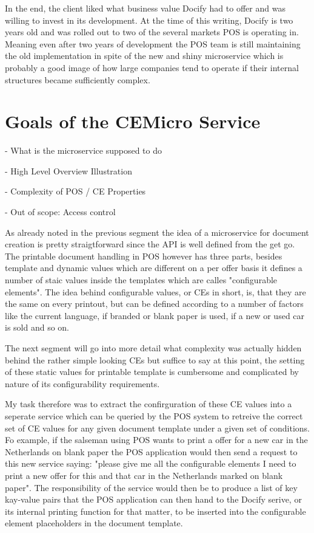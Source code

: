 In the end, the client liked what business value Docify had to offer and was willing to invest in its development. At the time of this writing, Docify is two years old and was rolled out to two of the several markets POS is operating in. Meaning even after two years of development the POS team is still maintaining the old implementation in spite of the new and shiny microservice which is probably a good image of how large companies tend to operate if their internal structures became sufficiently complex.


\section{Goals of the CEMicro Service}

- What is the microservice supposed to do

- High Level Overview Illustration

- Complexity of POS / CE Properties

- Out of scope: Access control


As already noted in the previous segment the idea of a microservice for document creation is pretty straigtforward since the API is well defined from the get go. The printable document handling in POS however has three parts, besides template and dynamic values which are different on a per offer basis it defines a number of staic values inside the templates which are calles "configurable elements". The idea behind configurable values, or CEs in short, is, that they are the same on every printout, but can be defined according to a number of factors like the current language, if branded or blank paper is used, if a new or used car is sold and so on.

The next segment will go into more detail what complexity was actually hidden behind the rather simple looking CEs but suffice to say at this point, the setting of these static values for printable template is cumbersome and complicated by nature of its configurability requirements.

My task therefore was to extract the confirguration of these CE values into a seperate service which can be queried by the POS system to retreive the correct set of CE values for any given document template under a given set of conditions. Fo example, if the salseman using POS wants to print a offer for a new car in the Netherlands on blank paper the POS application would then send a request to this new service saying: "please give me all the configurable elements I need to print a new offer for this and that car in the Netherlands marked on blank paper". The responsibility of the service would then be to produce a list of key kay-value pairs that the POS application can then hand to the Docify serive, or its internal printing function for that matter, to be inserted into the configurable element placeholders in the document template.

